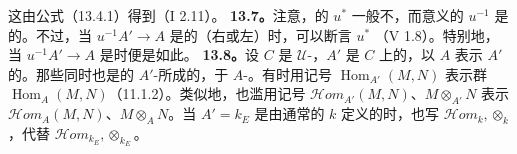 这由公式（13.4.1）得到（I 2.11）。
\textbf{13.7。}注意，的 $u^*$ 一般不，而意义的 $u^{-1}$ 是的。不过，当 $u^{-1}A'\to A$ 是的（右或左）时，可以断言 $u^*$ （V 1.8）。特别地，当 $u^{-1}A'\to A$ 是时便是如此。
\textbf{13.8。}设 $C$ 是 $\mathcal U$-，$A'$ 是 $C$ 上的，以 $A$ 表示 $A'$ 的。那些同时也是的 $A'$-所成的，于 $A$-。有时用记号 $\operatorname{Hom}_{A'}(M,N)$ 表示群 $\operatorname{Hom}_A(M,N)$（11.1.2）。类似地，也滥用记号 $\mathscr{H}\!om_{A'}(M,N)$、$M\otimes_{A'}N$ 表示 $\mathscr{H}\!om_A(M,N)$、$M\otimes_A N$。当 $A'=k_E$ 是由通常的 $k$ 定义的时，也写 $\mathscr{H}\!om_k,\otimes_k$，代替 $\mathscr{H}\!om_{k_E},\otimes_{k_E}$。
